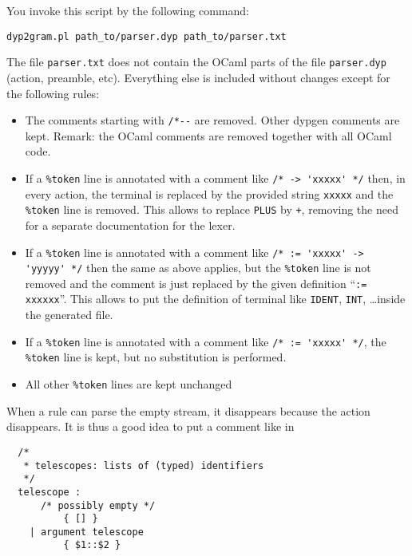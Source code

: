 \documentclass[12pt]{article}
\begin{document}
{You invoke this script by the following command:
\begin{verbatim}
dyp2gram.pl path_to/parser.dyp path_to/parser.txt
\end{verbatim}

The file \verb|parser.txt| does not contain the OCaml parts of the file \verb|parser.dyp| (action, preamble, etc). Everything else is included without changes except for the following rules:

\begin{itemize}

\item The comments starting with \verb|/*--| are removed. Other dypgen comments
are kept. Remark: the OCaml comments are removed together with all OCaml code.

\item If a \verb|%token| line is annotated with a comment like
\verb|/* -> 'xxxxx' */| then, in every action, the terminal is replaced by the provided string \verb|xxxxx| and the \verb|%token| line is removed.  This allows to replace \verb|PLUS| by \verb|+|, removing the need for a separate documentation for the lexer.

\item If a \verb|%token| line is annotated with a comment like
\verb|/* := 'xxxxx' -> 'yyyyy' */| then the same as above applies, but the \verb|%token| line is
not removed and the comment is just replaced by the given definition
``\verb|:= xxxxxx|''.  This allows to put the definition of terminal like \verb|IDENT|, \verb|INT|, \ldots  inside the generated file.

\item If a \verb|%token| line is annotated with a comment like
\verb|/* := 'xxxxx' */|, the \verb|%token| line is kept, but no substitution is performed.

\item All other \verb|%token| lines are kept unchanged

\end{itemize}

When a rule can parse the empty stream, it disappears because the action
disappears. It is thus a good idea to put a comment like in

\begin{verbatim}
  /*
   * telescopes: lists of (typed) identifiers
   */
  telescope :
      /* possibly empty */
          { [] }
    | argument telescope
          { $1::$2 }
\end{verbatim}

}
\end{document}
